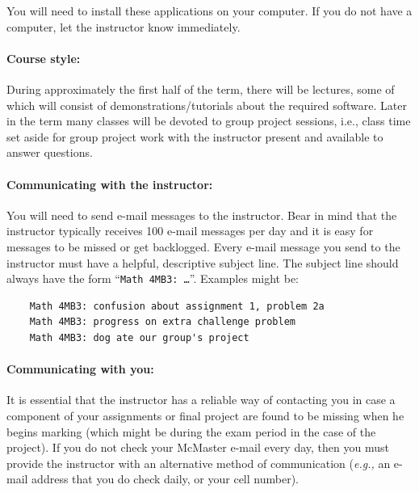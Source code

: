 \documentclass[12pt]{article}
\begin{document}
\noindent You will need to install these applications on your computer.  If you do not have a computer, let the instructor know immediately.

\paragraph*{Course style:}

During approximately the first half of the term, there will be lectures, some of which will consist of demonstrations/tutorials about the required software.  Later in the term many classes will be devoted to group project sessions, i.e., class time set aside for group project work with the instructor present and available to answer questions.

\paragraph*{Communicating with the instructor:}

You will need to send e-mail messages to the instructor.  Bear in mind that the instructor typically receives 100 e-mail messages per day and it is easy for messages to be missed or get backlogged.  Every e-mail message you send to the instructor must have a helpful, descriptive subject line.  The subject line should always have the form ``{\tt Math 4MB3: \dots}''.  Examples might be:
\begin{verbatim}
    Math 4MB3: confusion about assignment 1, problem 2a
    Math 4MB3: progress on extra challenge problem
    Math 4MB3: dog ate our group's project
\end{verbatim}

\paragraph*{Communicating with you:}

It is essential that the instructor has a reliable way of contacting you in case a component of your assignments or final project are found to be missing when he begins marking (which might be during the exam period in the case of the project).  If you do not check your McMaster e-mail every day, then you must provide the instructor with an alternative method of communication (\emph{e.g.,} an e-mail address that you do check daily, or your cell number).
\end{document}
